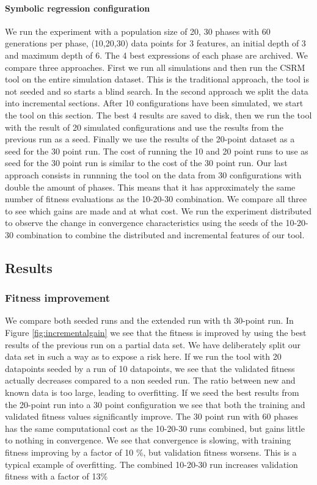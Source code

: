 \paragraph{Symbolic regression configuration}
We run the experiment with a population size of 20, 30 phases with 60 generations per phase, (10,20,30) data points for 3 features, an initial depth of 3 and maximum depth of 6. The 4 best expressions of each phase are archived.
We compare three approaches. First we run all simulations and then run the CSRM tool on the entire simulation dataset. This is the traditional approach, the tool is not seeded and so starts a blind search. 
In the second approach we split the data into incremental sections. After 10 configurations have been simulated, we start the tool on this section. The best 4 results are saved to disk, then we run the tool with the result of 20 simulated configurations and use the results from the previous run as a seed. Finally we use the results of the 20-point dataset as a seed for the 30 point run. The cost of running the 10 and 20 point runs to use as seed for the 30 point run is similar to the cost of the 30 point run. 
Our last approach consists in runnning the tool on the data from 30 configurations with double the amount of phases. This means that it has approximately the same number of fitness evaluations as the 10-20-30 combination. We compare all three to see which gains are made and at what cost. We run the experiment distributed to observe the change in convergence characteristics using the seeds of the 10-20-30 combination to combine the distributed and incremental features of our tool.

\subsection{Results}
\subsubsection{Fitness improvement}
We compare both seeded runs and the extended run with th 30-point run. In Figure \ref{fig:incrementalgain} we see that the fitness is improved by using the best results of the previous run on a partial data set. We have deliberately split our data set in such a way as to expose a risk here. If we run the tool with 20 datapoints seeded by a run of 10 datapoints, we see that the validated fitness actually decreases compared to a non seeded run. The ratio between new and known data is too large, leading to overfitting. If we seed the best results from the 20-point run into a 30 point configuration we see that both the training and validated fitness values significantly improve. The 30 point run with 60 phases has the same computational cost as the 10-20-30 runs combined, but gains little to nothing in convergence. We see that convergence is slowing, with training fitness improving by a factor of 10 \%, but validation fitness worsens. This is a typical example of overfitting. The combined 10-20-30 run increases validation fitness with a factor of 13\%


